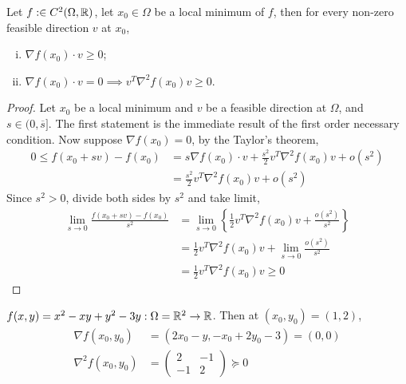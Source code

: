 \documentclass{article}
\begin{document}
   	\begin{theorem}
   		Let $f: \in C^2(\Omega, \mathbb{R})$, let $x_0 \in \Omega$ be a local minimum of $f$, then for every non-zero feasible direction $v$ at $x_0$,
   		\begin{enumerate}[(i)]
   			\item $\nabla f(x_0) \cdot v \geq 0$;
   			\item $\nabla f(x_0) \cdot v = 0 \implies v^T \nabla^2 f(x_0) v \geq 0$.
   		\end{enumerate}
   	\end{theorem}
   	
   	\begin{proof}
   		Let $x_0$ be a local minimum and $v$ be a feasible direction at $\Omega$, and $s \in (0, \overline{s}]$. The first statement is the immediate result of the first order necessary condition. Now suppose $\nabla f(x_0) = 0$, by the Taylor's theorem,
   		\begin{align}
   			0 \leq f(x_0 + sv) - f(x_0) &= s \nabla f(x_0) \cdot v + \frac{s^2}{2} v^T \nabla^2 f(x_0) v + o(s^2) \\
   			&=\frac{s^2}{2} v^T \nabla^2 f(x_0) v + o(s^2)
   		\end{align}
   		Since $s^2 > 0$, divide both sides by $s^2$ and take limit,
   		\begin{align}
   			\lim_{s \to 0} \frac{f(x_0 + sv) - f(x_0)}{s^2} &= \lim_{s \to 0} 
   			\left \{\frac{1}{2} v^T \nabla^2 f(x_0) v + \frac{o(s^2)}{s^2} \right\}\\
   			&= \frac{1}{2} v^T \nabla^2 f(x_0) v + \lim_{s \to 0} \frac{o(s^2)}{s^2} \\
   			&= \frac{1}{2} v^T \nabla^2 f(x_0) v \geq 0
   		\end{align}
   	\end{proof}
   	
	\begin{example}
		$f(x, y) = x^2 - xy + y^2 - 3y: \Omega = \mathbb{R}^2 \to \mathbb{R}$. Then at $(x_0, y_0) = (1, 2)$, 
		\begin{align}
			\nabla f(x_0, y_0) &= (2x_0 - y, -x_0 + 2y_0 - 3) = (0, 0) \\
			\nabla^2 f(x_0, y_0) &= 
			\begin{pmatrix}
				2 & -1 \\ -1 & 2
			\end{pmatrix} \succcurlyeq 0 
		\end{align}
	\end{example}
	
\end{document}
